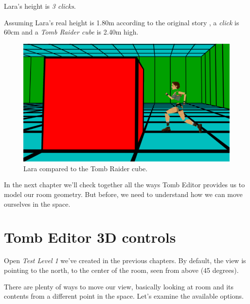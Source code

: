 \begin{remark}
    Lara's height is \emph{3 clicks}.
\end{remark}

\begin{remark}
    Assuming Lara's real height is 1.80m according to the original story \cite{wikiraider_LaraCroft}, a \emph{click} is 60cm and a \emph{Tomb Raider cube} is 2.40m high.
\end{remark}

\begin{figure}
    \centering
     \includegraphics[width=1\textwidth]{screenshots/1010.png}
     \caption{Lara compared to the Tomb Raider cube.}
     \label{fig:TIDELaraAndCube} 
\end{figure}

In the next chapter we'll check together all the ways Tomb Editor provides us to model our room geometry. But before, we need to understand how we can move ourselves in the space.

\section{Tomb Editor 3D controls}

Open \emph{Test Level 1} we've created in the previous chapters. By default, the view is pointing to the north, to the center of the room, seen from above (45 degrees).
\par There are plenty of ways to move our view, basically looking at room and its contents from a different point in the space. Let's examine the available options.

